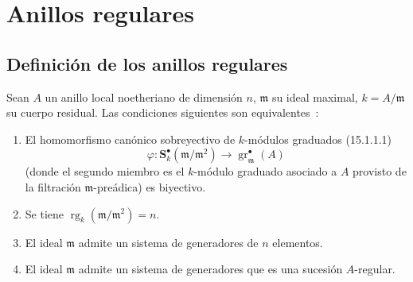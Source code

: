 \section{Anillos regulares}
\label{section:0.17-fr}

\subsection{Definición de los anillos regulares}
\label{subsection:0.17.1-fr}

\begin{proposition}[17.1.1]
\label{0.17.1.1-fr}
Sean $A$ un anillo local noetheriano de dimensión $n$, $\mathfrak{m}$ su
ideal maximal, $k=A/\mathfrak{m}$ su cuerpo residual. Las condiciones siguientes
son equivalentes~:
\begin{enumerate}
  \item[\rm a)] El homomorfismo canónico sobreyectivo de $k$-módulos graduados
  \textup{(15.1.1.1)}
  \[
    \varphi:\mathbf{S}^\bullet_k(\mathfrak{m}/\mathfrak{m}^2)
    \longrightarrow\operatorname{gr}^\bullet_{\mathfrak{m}}(A)
  \]
  (donde el segundo miembro es el $k$-módulo graduado asociado a $A$ provisto de
  la filtración $\mathfrak{m}$-preádica) es biyectivo.
  \item[\rm b)] Se tiene
  $\operatorname{rg}_k(\mathfrak{m}/\mathfrak{m}^2)=n$.
  \item[\rm c)] El ideal $\mathfrak{m}$ admite un sistema de generadores de $n$
  elementos.
  \item[\rm d)] El ideal $\mathfrak{m}$ admite un sistema de generadores que es
  una sucesión $A$-regular.
\end{enumerate}
\end{proposition}


